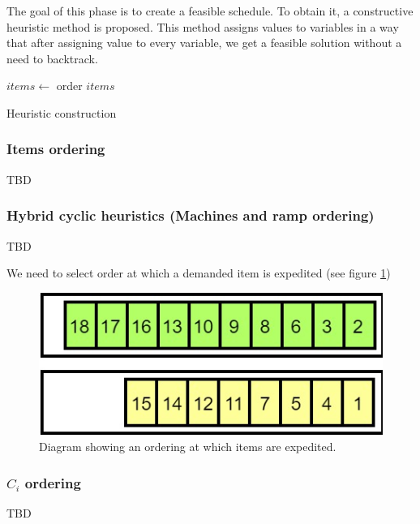 \documentclass{ctuthesis}
\begin{document}
The goal of this phase is to create a feasible schedule. To obtain it, a constructive heuristic method is proposed. This method assigns values to variables in a way that after assigning value to every variable, we get a feasible solution without a need to backtrack.

\begin{algorithm}[H]
\SetAlgoLined
{}
  $items \leftarrow$ order $items$\;
\caption{Heuristic construction}
\end{algorithm}

\subsubsection{Items ordering}
TBD

\subsubsection{Hybrid cyclic heuristics (Machines and ramp ordering)}
TBD

We need to select order at which a demanded item is expedited (see figure \ref{order})
\begin{figure}[h]
\includegraphics[width=0.8\linewidth]{order.jpg}
\caption{Diagram showing an ordering at which items are expedited.}
\label{order}
\end{figure}
\subsubsection{$C_i$ ordering}
TBD
\end{document}

